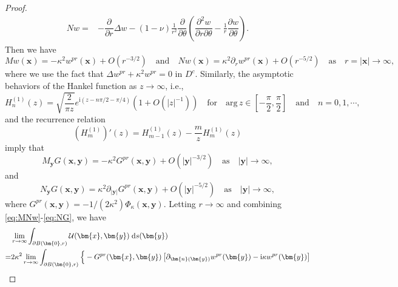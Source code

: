 \documentclass[10pt,a4paper]{article}
\numberwithin{equation}{section}
\begin{document}
\begin{proof}
\begin{align}
    \label{eq:Npolar}
 N w  = & -\dfrac{\partial }{\partial r}\Delta w - (1-\nu) \frac{1}{r^{2}} \dfrac{\partial }{\partial \theta} \left(\dfrac{\partial^2 w}{\partial r \partial \theta} - \frac{1}{r} \dfrac{\partial w}{\partial \theta}\right).
  \end{align}
  Then we have
  \begin{equation}\label{eq:MNw}
    M w(\bm{ x }) = -\kappa^2 w^{pr}(\bm{ x }) + O(r^{-3/2}) \quad \mathrm{ and } \quad
    N w(\bm{ x }) = \kappa^{2}\partial_r  w^{pr}(\bm{ x }) + O(r^{-5/2}) \quad  \mathrm{as}\quad r=| \bm{ x } | \to \infty,
  \end{equation}
  where we use the fact that $\Delta w^{pr}+ \kappa^2 w^{pr}=0$ in $D^c$. Similarly,
  the asymptotic behaviors of the Hankel function \cite[Chapter 7, section 4.1]{olver_asymptotic_1974} as $z\to\infty$, i.e.,
\begin{equation}\label{eq:Hankel}
H^{(1)}_{n}(z ) = \sqrt{\frac{2}{\pi z}}e^{\mathrm{ i } (z-n\pi/2-\pi/4)}\left(1+O(|z|^{-1})\right) \quad \mathrm{ for } \quad\mathrm{arg}\, z \in [-\frac{\pi}{2}, \frac{\pi}{2}] \quad \mathrm{ and } \quad n=0,1,\cdots, 
\end{equation}
and the recurrence relation
\begin{equation*}
(H^{(1)}_m)'(z)= H^{(1)}_{m-1}(z)-\frac{m}{z} H^{(1)}_m(z)
\end{equation*}
  imply that
  \begin{equation}\label{eq:MG}
    M_{\bm{ y }}  G(\bm{ x }, \bm{ y })  = -\kappa^2 G^{pr}(\bm{ x }, \bm{ y })  + O(| \bm{ y } | ^{-3/2})  \quad  \mathrm{as}\quad | \bm{ y } | \to \infty,
  \end{equation}
  and
  \begin{equation}
    \label{eq:NG}
    N_{\bm{ y }}  G(\bm{ x }, \bm{ y })  = \kappa^{2}\partial_{| \bm{ y } | }  G^{pr}(\bm{ x }, \bm{ y }) + O(| \bm{ y } | ^{-5/2}) \quad  \mathrm{as}\quad | \bm{ y } | \to \infty,
  \end{equation}
where $G^{pr}(\bm{ x }, \bm{ y }) = -1/(2 \kappa^2)\Phi_{\kappa}(\bm{ x }, \bm{ y })$.
Letting $r\to \infty$ and combining \eqref{eq:MNw}-\eqref{eq:NG}, we have
\begin{align}
  \notag
  &\lim\limits_{r\to\infty} \int_{\partial B(\bm{ 0 },r) }  \mathcal{U}(\bm{ x },\bm{ y })
    \;\mathrm{d}s(\bm{ y })\\
\notag
  = & 2\kappa^2 \lim\limits_{r\to\infty}  \int_{\partial B(\bm{ 0 },r) } \Big\{ 
      -G^{pr}(\bm{ x }, \bm{ y })\left[ \partial_{\bm{n}(\bm{ y }) } w^{pr}(\bm{ y }) - \mathrm{ i } \kappa w^{pr}(\bm{ y}) \right]\\

\end{align}
\end{proof}
\end{document}
